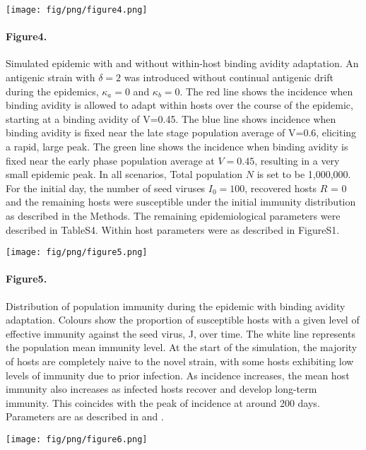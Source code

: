 \documentclass[12pt,a4paper]{article}
\begin{document}
\texttt{[image: fig/png/figure4.png]}
\paragraph*{Figure4.}
\label{Fig4}
Simulated epidemic with and without within-host binding avidity adaptation. An antigenic strain with $\delta=2$ was introduced without continual antigenic drift during the epidemics, $\kappa_{a}=0$ and $\kappa_{b}=0$. The red line shows the incidence when binding avidity is allowed to adapt within hosts over the course of the epidemic, starting at a binding avidity of V=0.45. The blue line shows incidence when binding avidity is fixed near the late stage population average of V=0.6, eliciting a rapid, large peak. The green line shows the incidence when binding avidity is fixed near the early phase population average at $V=0.45$, resulting in a very small epidemic peak. In all scenarios, Total population $N$ is set to be 1,000,000. For the initial day, the number of seed viruses $I_{0} = 100$, recovered hosts $R$ = 0 and the remaining hosts were susceptible under the initial immunity distribution as described in the Methods. The remaining epidemiological parameters were described in TableS4. Within host parameters were as described in FigureS1.
\clearpage

\texttt{[image: fig/png/figure5.png]}
\paragraph*{Figure5.}
\label{Fig5}
Distribution of population immunity during the epidemic with binding avidity adaptation. Colours show the proportion of susceptible hosts with a given level of effective immunity against the seed virus, J, over time. The white line represents the population mean immunity level. At the start of the simulation, the majority of hosts are completely naive to the novel strain, with some hosts exhibiting low levels of immunity due to prior infection. As incidence increases, the mean host immunity also increases as infected hosts recover and develop long-term immunity. This coincides with the peak of incidence at around 200 days. Parameters are as described in  and .
\clearpage

\texttt{[image: fig/png/figure6.png]}
\end{document}

